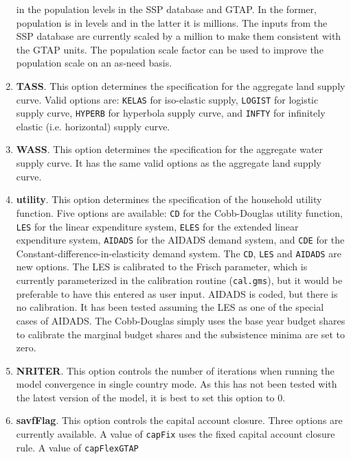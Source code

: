 \begin{enumerate}
{         in the population levels in the SSP database and GTAP. In the former,
         population is in levels and in the latter it is millions.
         The inputs from the SSP database are currently scaled by a million to
         make them consistent with the GTAP units. The population scale factor
         can be used to improve the population scale on an as-need basis.}
   \item \textbf{TASS}. This option determines the specification for the
         aggregate land supply curve. Valid options are: \texttt{KELAS} for
         iso-elastic supply, \texttt{LOGIST} for logistic supply curve,
         \texttt{HYPERB} for hyperbola supply curve, and \texttt{INFTY} for
         infinitely elastic (i.e. horizontal) supply curve.
   \item \textbf{WASS}. This option determines the specification for the
         aggregate water supply curve. It has the same valid options as the
         aggregate land supply curve.
   \item \textbf{utility}. This option determines the specification of the
         household utility function. Five options are available: \texttt{CD} for
         the Cobb-Douglas utility function, \texttt{LES} for the linear
         expenditure system, \texttt{ELES} for the extended linear expenditure
         system, \texttt{AIDADS} for the AIDADS demand system, and \texttt{CDE}
         for the Constant-difference-in-elasticity demand system. The
         \texttt{CD}, \texttt{LES} and \texttt{AIDADS} are new options. The LES
         is calibrated to the Frisch parameter, which is currently
         parameterized in the calibration routine (\texttt{cal.gms}), but it
         would be preferable to have this entered as user input. AIDADS is
         coded, but there is no calibration. It has been tested assuming the LES
         as one of the special cases of AIDADS. The Cobb-Douglas simply uses the
         base year budget shares to calibrate the marginal budget shares and the
         subsistence minima are set to zero.
   \item \textbf{NRITER}. This option controls the number of iterations when
         running the model convergence in single country mode. As this has not
         been tested with the latest version of the model, it is best to set
         this option to 0.
   \item \textbf{savfFlag}. This option controls the capital account closure.
         Three options are currently available. A value of \texttt{capFix} uses
         the fixed capital account closure rule. A value of \texttt{capFlexGTAP}

\end{enumerate}
